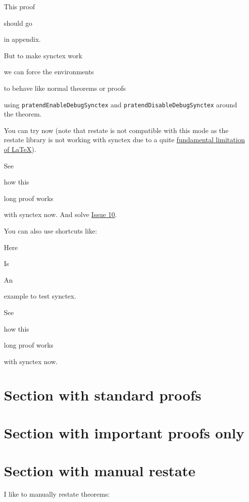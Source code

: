 \documentclass{article}
\begin{document}
\pratendEnableDebugSynctex{}

\begin{thmE}
  This proof

  should go

  in appendix.

  But to make synctex work

  we can force the environments

  to behave like normal theorems or proofs

  using \texttt{pratendEnableDebugSynctex} and \texttt{pratendDisableDebugSynctex} around the theorem.

  You can try now (note that restate is not compatible with this mode as the restate library is not working with synctex due to a quite \href{https://tex.stackexchange.com/questions/643294/synctex-make-it-work-with-environment-accessing-its-content-e-g-environ-or-xp}{fundamental limitation of LaTeX}).
\end{thmE}
\begin{proofED}
  See

  how this

  long proof works

  with synctex now. And solve \href{https://github.com/leo-colisson/proof-at-the-end/issues/10}{Issue 10}.
\end{proofED}


\pratendDisableDebugSynctex{}

You can also use shortcuts like:

\begin{thmED}
  Here

  Is

  An

  example to test synctex.
\end{thmED}
\begin{proofEndDebug}
  See

  how this

  long proof works

  with synctex now.
\end{proofEndDebug}


\section{Section with standard proofs}
% 
\printProofs

\section{Section with important proofs only}
\printProofs[greattheorem]

\section{Section with manual restate}\label{sec:manualrestate}

I like to manually restate theorems:
\mymanualrestate*
\end{document}
